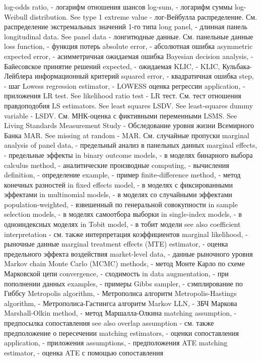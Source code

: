 log-odds ratio, - логарифм отношения шансов
log-sum, - логарифм суммы
log-Weibull distribution. See type 1 extreme value - лог-Вейбулла распределение. См. распределение экстремальных значений 1-го типа
long panel, - длинная панель
longitudinal data. See panel data - лонгитюдные данные. См. панельные данные
loss function, - функция потерь
absolute error, - абсолютная ошибка
asymmetric expected error, - асимметричная ожидаемая ошибка
Bayesian decision analysis, - Байесовское принятие решений
expected, - ожидаемая
KLIC, - KLIC, Кульбака-Лейблера информационный критерий
squared error, - квадратичная ошибка
step, - шаг
Lowess regression estimator, - LOWESS оценка регрессии
application, - приложения
LR test. See likelihood ratio test - LR тест. См. тест отношения правдоподобия
LS estimators. See least squares
LSDV. See least-squares dummy variable - LSDV. См. МНК-оценка с фиктивными переменными
LSMS. See Living Standards Measurement Study - Обследование уровня жизни Всемирного Банка
MAR. See missing at random - MAR. См. случайные пропуски
marginal analysis of panel data, - предельный анализ в панельных данных
marginal effects, - предельные эффекты
in binary outcome models, - в моделях бинарного выбора
calculus method, - аналитические производные
computing, - вычисления
definition, - определение
example, - пример
finite-difference method, - метод конечных разностей
in fixed effects model, - в моделях с фиксированными эффектами
in multinomial models, - в моделях со случайными эффектами
population-weighted, - взвешенный по генеральной совокупности
in sample selection models, - в моделях самоотбора выборки
in single-index models, - в одноиндексных моделях
in Tobit model, - в тобит модели
see also coefficient interpretation - см. также интерпретация коэффициентов
marginal likelihood, - рыночные данные
marginal treatment effects (MTE) estimator, - оценка предельного эффекта воздействия
market-level data, - данные рыночного уровня
Markov chain Monte Carlo (MCMC) methods, - метод Монте Карло по схеме Марковской цепи
convergence, - сходимость
in data augmentation, - при пополнении данных
examples, - примеры
Gibbs sampler, - сэмплирование по Гиббсу
Metropolis algorithm, - Метрополиса алгоритм
Metropolis-Hastings algorithm, - Метрополиса-Гастингса алгоритм
Markov LLN, - ЗБЧ Маркова
Marshall-Olkin method, - метод Маршалла-Олкина
matching assumption, - предпосылка сопоставления
see also overlap assumption - см. также предположение о пересечении
matching estimators, - оценки сопоставления
application, - приложения
assumptions, - предположения
ATE matching estimator, - оценка ATE с помощью сопоставления
